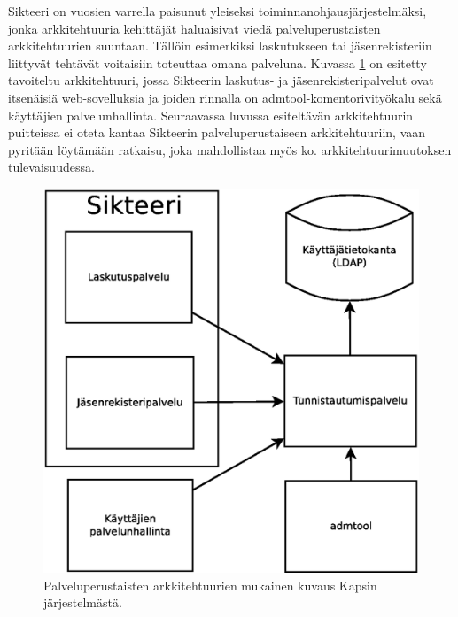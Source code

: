 Sikteeri on vuosien varrella paisunut yleiseksi toiminnanohjausjärjestelmäksi, jonka arkkitehtuuria kehittäjät haluaisivat viedä palveluperustaisten arkkitehtuurien suuntaan. Tällöin esimerkiksi laskutukseen tai jäsenrekisteriin liittyvät tehtävät voitaisiin toteuttaa omana palveluna. Kuvassa \ref{kapsi_uusi} on esitetty tavoiteltu arkkitehtuuri, jossa Sikteerin laskutus- ja jäsenrekisteripalvelut ovat itsenäisiä web-sovelluksia ja joiden rinnalla on admtool-komentorivityökalu sekä käyttäjien palvelunhallinta. Seuraavassa luvussa esiteltävän arkkitehtuurin puitteissa ei oteta kantaa Sikteerin palveluperustaiseen arkkitehtuuriin, vaan pyritään löytämään ratkaisu, joka mahdollistaa myös ko. arkkitehtuurimuutoksen tulevaisuudessa.

\begin{figure}[ht]
\centering
\includegraphics[width=.7\textwidth]{toteutus/muutostarve/kapsi_uusi_soa.eps}
\caption{Palveluperustaisten arkkitehtuurien mukainen kuvaus Kapsin järjestelmästä.}%
\label{kapsi_uusi}
\end{figure}